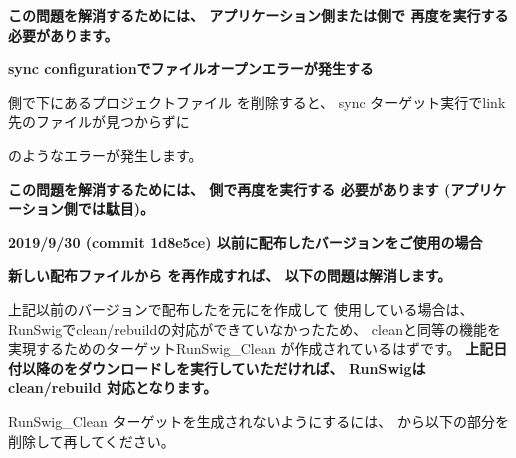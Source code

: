 \medskip
\bf{この問題を解消するためには、
アプリケーション側または\SprLib 側で 再度\cmake を実行する必要があります。}

\thinrule{\linewidth}
\bf{sync configurationでファイルオープンエラーが発生する}

\medskip
\SprLib 側で下にあるプロジェクトファイル
を削除すると、
sync ターゲット実行でlink先のファイルが見つからずに


のようなエラーが発生します。

\bf{この問題を解消するためには、
\SprLib 側で再度\cmake を実行する 必要があります (アプリケーション側では駄目)。}

\thinrule{\linewidth}
\bf{2019/9/30 (commit 1d8e5ce) 以前に配布したバージョンをご使用の場合}

\bf{新しい配布ファイルから \CMakeLists{} を再作成すれば、 以下の問題は解消します。}

\medskip
上記以前のバージョンで配布したを元に\QCMakeLists{}を作成して
使用している場合は、 RunSwigでclean/rebuildの対応ができていなかったため、
cleanと同等の機能を実現するためのターゲットRunSwig\_Clean が作成されているはずです。
\bf{上記日付以降の\SprLib をダウンロードし\cmake を実行していただければ、
RunSwigはclean/rebuild 対応となります。}


RunSwig\_Clean ターゲットを生成されないようにするには、
\QCMakeLists{}から以下の部分を削除して再\cmake してください。


